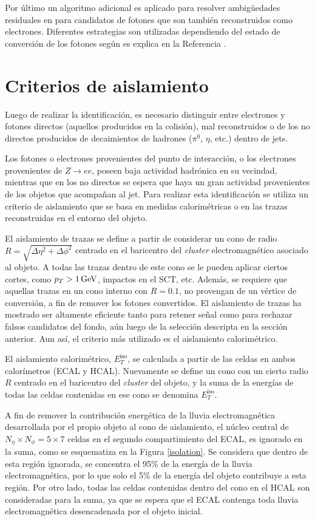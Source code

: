 Por último un algoritmo adicional es aplicado para resolver ambigüedades residuales en para candidatos de fotones que son también reconstruidos como electrones. Diferentes estrategias son utilizadas dependiendo del estado de conversión de los fotones según es explica en la Referencia \cite{ambiguity}.


\section{Criterios de aislamiento}

Luego de realizar la identificación, es necesario distinguir entre electrones y fotones directos (aquellos producidos en la colisión), mal reconstruidos o de los no directos producidos de decaimientos de hadrones ($\pi^{0}$, $\eta$, etc.) dentro de jets.

Los fotones o electrones provenientes del punto de interacción, o los electrones provenientes de $Z\rightarrow ee$, poseen baja actividad hadrónica en su vecindad, mientras que en los no directos se espera que haya un gran actividad provenientes de los objetos que acompañan al jet. Para realizar esta identificación se utiliza un criterio de aislamiento que se basa en medidas calorimétricas o en las trazas reconstruidas en el entorno del objeto.

El aislamiento de trazas se define a partir de considerar un cono de radio $R=\sqrt{\Delta\eta^{2}+\Delta\phi^{2}}$ centrado en el baricentro del \textit{cluster} electromagnético asociado al objeto. A todas las trazas dentro de este cono se le pueden aplicar ciertos cortes, como $p_{T}>1 \, \mathrm{GeV}$, impactos en el SCT, etc. Además, se requiere que aquellas trazas en un cono interno con $R=0.1$, no provengan de un vértice de conversión, a fin de remover los fotones convertidos. El aislamiento de trazas ha mostrado ser altamente eficiente tanto para retener señal como para rechazar falsos candidatos del fondo, aún luego de la selección descripta en la sección anterior. Aun así, el criterio más utilizado es el aislamiento calorimétrico.

El aislamiento calorimétrico, $E_{T}^{\text{iso}}$, se calculada a partir de las celdas en ambos calorímetros (ECAL y HCAL). Nuevamente se define un cono con un cierto radio $R$ centrado en el baricentro del \textit{cluster} del objeto, y la suma de la energías de todas las celdas contenidas en ese cono se denomina $E_{T}^{\text{iso}}$. 

A fin de remover la contribución energética de la lluvia electromagnética desarrollada por el propio objeto al cono de aislamiento, el núcleo central de $N_{\eta}\times N_{\phi} = 5 \times 7$ celdas en el segundo compartimiento del ECAL, es ignorado en la suma, como se esquematiza en la Figura \ref{isolation}. Se considera que dentro de esta región ignorada, se concentra el 95\% de la energía de la lluvia electromagnética, por lo que solo el 5\% de la energía del objeto contribuye a esta región. Por otro lado, todas las celdas contenidas dentro del cono en el HCAL son consideradas para la suma, ya que se espera que el ECAL contenga toda lluvia electromagnética desencadenada por el objeto inicial. 

